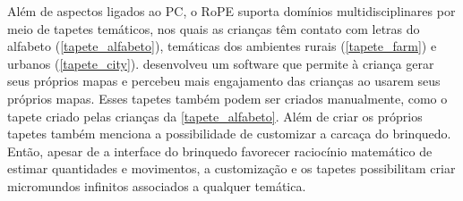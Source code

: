 Além de aspectos ligados ao PC, o RoPE suporta domínios multidisciplinares por meio de tapetes temáticos, nos quais as crianças têm contato com letras do alfabeto (\autoref{tapete_alfabeto}), temáticas dos ambientes rurais (\autoref{tapete_farm}) e urbanos (\autoref{tapete_city}).  desenvolveu um software que permite à criança gerar seus próprios mapas e percebeu mais engajamento das crianças ao usarem seus próprios mapas. Esses tapetes também podem ser criados manualmente, como o tapete criado pelas crianças da \autoref{tapete_alfabeto}. Além de criar os próprios tapetes  também menciona a possibilidade de customizar a carcaça do brinquedo. Então, apesar de a interface do brinquedo favorecer raciocínio matemático de estimar quantidades e movimentos, a customização e os tapetes possibilitam criar micromundos infinitos associados a qualquer temática.

